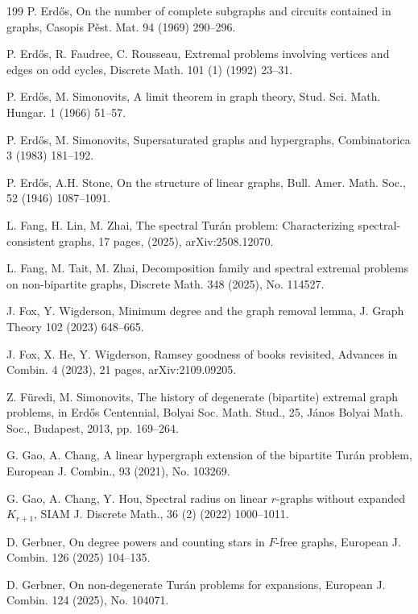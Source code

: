 \documentclass[11pt,a4paper]{article}
\theoremstyle{plain}
\theoremstyle{definition}
\begin{document}
\begin{thebibliography}{199}
P. Erd\H{o}s, 
On the number of complete subgraphs and circuits contained in graphs, 
Casopis P\v{e}st. Mat. 94 (1969) 290--296. 

 P. Erd\H{o}s, R. Faudree, C. Rousseau, 
 Extremal problems involving vertices and 
 edges on odd cycles, 
Discrete Math. 101 (1) (1992) 23--31.

P. Erd\H{o}s, M. Simonovits, 
A limit theorem in graph theory, 
Stud. Sci. Math. Hungar. 1 (1966) 51--57.  

P. Erd\H{o}s, M. Simonovits, 
Supersaturated graphs and hypergraphs, 
Combinatorica 3 (1983) 181--192.  

P.  Erd\H{o}s, A.H. Stone, 
On the structure of linear graphs,  
{Bull. Amer. Math. Soc.}, 52 (1946) 1087--1091.

L. Fang, H. Lin, M. Zhai, 
The spectral Tur\'{a}n problem: Characterizing
spectral-consistent graphs, 17 pages, 
(2025), arXiv:2508.12070.  

L. Fang, M. Tait, M. Zhai, 
Decomposition family and spectral extremal problems on non-bipartite graphs, 
Discrete Math. 348 (2025), No. 114527.


J. Fox, Y. Wigderson, 
Minimum degree and the graph removal lemma, 
J. Graph Theory 102 (2023) 648--665.

 J. Fox, X. He, Y. Wigderson, 
 Ramsey goodness of books revisited, 
Advances in Combin. 4 (2023),  21 pages, 
arXiv:2109.09205.  

Z. F\"uredi,  M. Simonovits,
The history of degenerate (bipartite) extremal graph problems,  
in Erd\H{o}s Centennial, 
Bolyai Soc. Math. Stud., 25, 
J\'{a}nos Bolyai Math. Soc., Budapest, 2013, 
pp. 169--264. 

G. Gao, A. Chang, 
A linear hypergraph extension of the bipartite Tur\'an problem, 
European J. Combin., 93 (2021), No. 103269.
 
G. Gao, A. Chang, Y. Hou, Spectral radius on  linear $r$-graphs without expanded $K_{r+1}$, 
SIAM J. Discrete Math., 36 (2) (2022) 1000--1011.

D. Gerbner, On degree powers and counting stars in $F$-free graphs, 
European J. Combin. 126 (2025) 104--135.

D. Gerbner, 
On non-degenerate Tur\'{a}n problems for
expansions, 
European J. Combin. 124 (2025), No. 104071.


\end{thebibliography}
\end{document}

